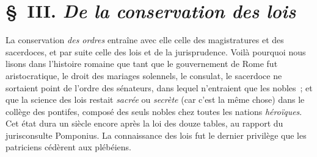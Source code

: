 \documentclass[french,twoside]{book} %
\begin{document}
\section[{§ III. De la conservation des lois}]{§ III. {\itshape De la conservation des lois}}
\noindent La conservation {\itshape des ordres} entraîne avec elle celle des magistratures et des sacerdoces, et par suite celle des lois et de la jurisprudence. Voilà  pourquoi nous lisons dans l’histoire romaine que tant que le gouvernement de Rome fut aristocratique, le droit des mariages solennels, le consulat, le sacerdoce ne sortaient point de l’ordre des sénateurs, dans lequel n’entraient que les nobles ; et que la science des lois restait {\itshape sacrée} ou {\itshape secrète} (car c’est la même chose) dans le collège des pontifes, composé des seuls nobles chez toutes les nations {\itshape héroïques}. Cet état dura un siècle encore après la loi des douze tables, au rapport du jurisconsulte Pomponius. La connaissance des lois fut le dernier privilège que les patriciens cédèrent aux plébéiens.\par
\end{document}
